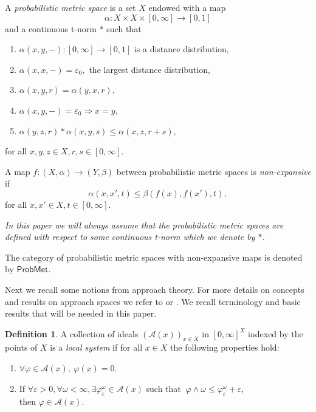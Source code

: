 \documentclass[12pt,a4paper]{amsart}
\theoremstyle{theorem}
\theoremstyle{definition}
\newtheorem{definition}[theorem]{Definition}
\newcommand{\aaa}{\ensuremath{\mathcal{A}}}
\newcommand{\PM}{\ensuremath{\mathsf{ProbMet_{}}}}
\renewcommand{\a}{\ensuremath{\alpha}}
\renewcommand{\b}{\ensuremath{\beta}}
\newcommand{\ve}{\ensuremath{\varepsilon}}
\def\rw{\rightarrow}
\begin{document}
{A \emph{probabilistic metric space} is a set $X$ endowed with a map
\begin{equation}\label{PrMet}
\a: X \times X \times [0,\infty] \rw [0,1]
\end{equation}
and a continuous t-norm $*$ such that
\begin{enumerate}
\item [{(P1)}] $\a(x,y,-): [0,\infty] \rw [0,1] $ is a distance distribution,
\item [{(P2)}] $\a (x,x,- ) = \ve_0,$ the largest distance distribution,
\item [{(P3)}] $\a(x,y,r) = \a(y,x,r),$
\item [{(P4)}] $\a(x,y,-) = \ve_0 \Rightarrow  x = y,$
\item [{(P5)}] $\a(y,z,r) * \a(x,y,s) \leq \a(x,z,r+s),$
\end{enumerate}
for all $x,y,z \in X, r,s \in [0, \infty].$

A map $f:(X,\a) \rw (Y,\b)$ between probabilistic metric spaces is \emph{non-expansive} if 
\begin{equation}\label{nonex}
\a(x,x',t) \leq \b(f(x), f(x'),t),
\end{equation}
for all $x,x' \in X, t \in [0, \infty].$

\emph{In this paper we will always assume that the probabilistic metric spaces are defined with respect to some continuous t-norm  which we denote by $*$.}

The category of probabilistic metric spaces with non-expansive maps is denoted by $\PM.$

Next we recall some notions from approach theory. For more details on concepts and results on approach spaces we refer to \cite{LOW} or \cite{apox}.  We recall terminology and basic results that will be needed in this paper. 




\begin{definition}\label{localdist}
A collection of ideals $(\aaa(x))_{x\in X}$ in $[0,\infty]^X$ indexed by the points of $X$ is a \emph{local system} if for all $x \in X$ the following properties hold:
\begin{enumerate}
\item[(A1)] $\forall \varphi \in \aaa(x), \ \varphi(x) = 0.$
\item [(A2)] If $\forall \ve > 0, \forall \omega < \infty, \exists \varphi_{\ve}^{\omega} \in \aaa(x)$ such that $ \ \varphi \wedge \omega \leq \varphi_{\ve}^{\omega} + \ve$,\\
 then $\varphi \in \aaa(x).$


\end{enumerate}
\end{definition}}
\end{document}
